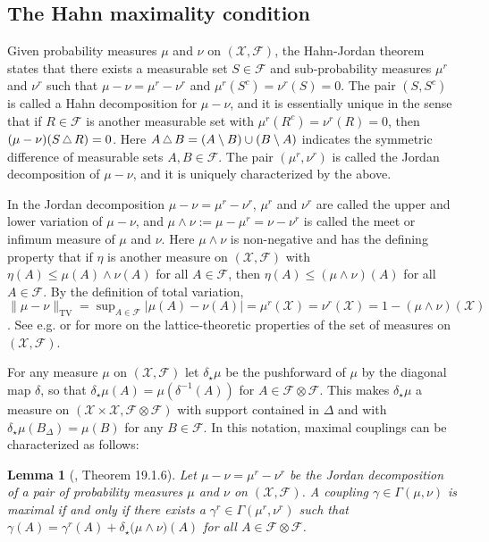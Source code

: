 \documentclass[aihp]{imsart}
\theoremstyle{plain}
\newtheorem{lemma}[theorem]{Lemma}
\theoremstyle{remark}
\theoremstyle{definition} \newtheorem{example}{Example}
\newcommand{\scrF}{\mathscr{F}}
\newcommand{\calX}{\mathcal{X}}
\newcommand{\TV}{\mathrm{TV}}
\newcommand{\symdiff}{ \operatorname{{\scalebox{.9}{$\bigtriangleup$}}}}
\newcommand{\calXp}{\calX \times \calX}
\newcommand{\scrFp}{\scrF \otimes \scrF}
\newcommand{\sm}{\setminus}
\begin{document}
\subsection{The Hahn maximality condition}

Given probability measures $\mu$ and $\nu$ on $(\calX, \scrF)$, the Hahn-Jordan theorem
\citep[e.g.][chapter 5.6]{Dudley2002} states that there exists a measurable set $S \in \scrF$ and
sub-probability measures $\mu^r$ and $\nu^r$ such that $\mu - \nu = \mu^r - \nu^r$ and $\mu^r(S^c) =
\nu^r(S) = 0$. The pair $(S,S^c)$ is called a Hahn decomposition for $\mu - \nu$, and it is
essentially unique in the sense that if $R \in \scrF$ is another measurable set with $\mu^r(R^c) =
\nu^r(R) = 0$, then $(\mu-\nu)(S \symdiff R) = 0$. Here $A \symdiff B = (A \sm B) \cup (B \sm A)$
indicates the symmetric difference of measurable sets $A, B \in \scrF$. The pair $(\mu^r, \nu^r)$ is
called the Jordan decomposition of $\mu - \nu$, and it is uniquely characterized by the above.

In the Jordan decomposition $\mu - \nu = \mu^r - \nu^r$, $\mu^r$ and $\nu^r$ are called the upper
and lower variation of $\mu - \nu$, and ${\mu \wedge \nu := \mu - \mu^r = \nu - \nu^r}$ is called
the meet or infimum measure of $\mu$ and $\nu$. Here $\mu \wedge \nu$ is non-negative and has the
defining property that if $\eta$ is another measure on $(\calX, \scrF)$ with $\eta(A) \leq \mu(A)
\wedge \nu(A)$ for all $A \in \scrF$, then $\eta(A) \leq (\mu \wedge \nu)(A)$ for all $A \in \scrF$.
By the definition of total variation, $\lVert \mu - \nu \rVert_\TV = \sup_{A \in \scrF}\lvert \mu(A)
- \nu(A) \rvert = \mu^r(\calX) = \nu^r(\calX) = 1 - (\mu \wedge \nu) (\calX)$. See e.g.
\citet[][chap. 5]{dshalalow2012foundations} or \citet[][sec. 36]{aliprantis1998principles} for more
on the lattice-theoretic properties of the set of measures on $(\calX, \scrF)$.

For any measure $\mu$ on $(\calX, \scrF)$ let $\delta_\star \mu$ be the pushforward of $\mu$ by the
diagonal map $\delta$, so that $\delta_\star \mu (A) = \mu (\delta^{-1} (A))$ for $A \in \scrFp$.
This makes $\delta_\star \mu$ a measure on $(\calXp, \scrFp)$ with support contained in $\Delta$ and
with $\delta_\star \mu (B_\Delta) = \mu (B)$ for any $B \in \scrF$. In this notation, maximal
couplings can be characterized as follows:

\smallskip

\begin{lemma}[\citet{douc2018markov}, Theorem 19.1.6]
\label{lem:douc}
Let $\mu - \nu = \mu^r - \nu^r$ be the Jordan decomposition
of a pair of probability measures $\mu$ and $\nu$ on $(\calX, \scrF)$.
A coupling $\gamma \in \Gamma(\mu, \nu)$ is maximal if and only if there exists a
$\gamma^r  \in \Gamma(\mu^r, \nu^r )$
such that $\gamma(A) = \gamma^r(A) + \delta_\star \big( \mu \wedge \nu \big) (A)$ for all $A \in \scrFp$.
\end{lemma}
\end{document}
